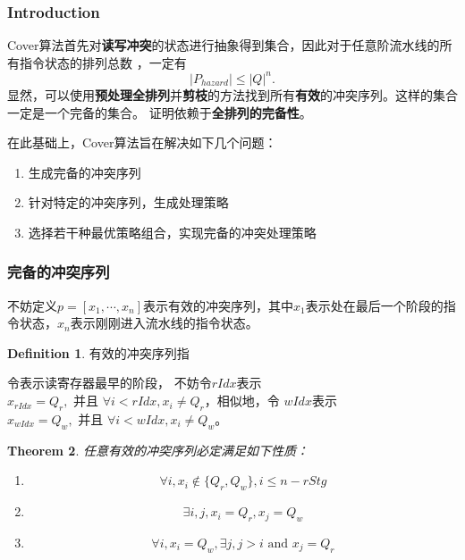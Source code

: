 \documentclass[hyperref,UTF8]{ctexart}
\newtheorem{thm}{Theorem}[subsection]
\theoremstyle{definition}
\newtheorem{defn}[thm]{Definition}
\theoremstyle{remark}
\numberwithin{equation}{subsection}
\newcommand{\Emph}{\textbf}
\begin{document}
\subsubsection{Introduction}
	
	Cover算法首先对\Emph{读写冲突}的状态进行抽象得到集合，因此对于任意阶流水线的所有指令状态的排列总数
	，一定有
	\[
		|P_{hazard}| \le |Q|^{n}.
	\]
	显然，可以使用\Emph{预处理全排列}并\Emph{剪枝}的方法找到所有\Emph{有效}的冲突序列。这样的集合一定是一个完备的集合。
	证明依赖于\Emph{全排列的完备性}。
	
	在此基础上，Cover算法旨在解决如下几个问题：
	\begin{enumerate}[(1)]
	
		\item 生成完备的冲突序列
		
		\item 针对特定的冲突序列，生成处理策略
		
		\item 选择若干种最优策略组合，实现完备的冲突处理策略
		
	\end{enumerate}
	
\subsubsection{完备的冲突序列}
	
	不妨定义$p = [x_1, \cdots, x_n]$表示有效的冲突序列，其中$x_1$表示处在最后一个阶段的指令状态，$x_n$表示刚刚进入流水线的指令状态。
	
	\begin{defn}
	\label{defn:valid_perm}
	有效的冲突序列指
	\end{defn}
	
	令表示读寄存器最早的阶段，
	不妨令$rIdx$表示$x_{rIdx} = Q_r, \text{ 并且 } \forall i < rIdx, x_i \neq Q_r$，相似地，令
		  $wIdx$表示$x_{wIdx} = Q_w, \text{ 并且 } \forall i < wIdx, x_i \neq Q_w$。
	
	\begin{thm}
	\label{thm:valid_perm_property}
	任意有效的冲突序列必定满足如下性质：
	\begin{enumerate}[(1)]
		
		\item
		\begin{equation}
			\forall i, x_i \notin \{Q_r, Q_w\}, i \le n - rStg		\label{equ:cover_begin}
		\end{equation}
		
		\item
		\begin{equation}
			\exists i, j, x_i = Q_r, x_j = Q_w						\label{equ:cover_exists}
		\end{equation}
		
		\item
		\begin{equation}
			\forall i, x_i = Q_w, \exists j, j > i \text{ and } x_j = Q_r	\label{equ:cover_rwcomp}
		\end{equation}
		
	\end{enumerate}
	\end{thm}
	
\end{document}
